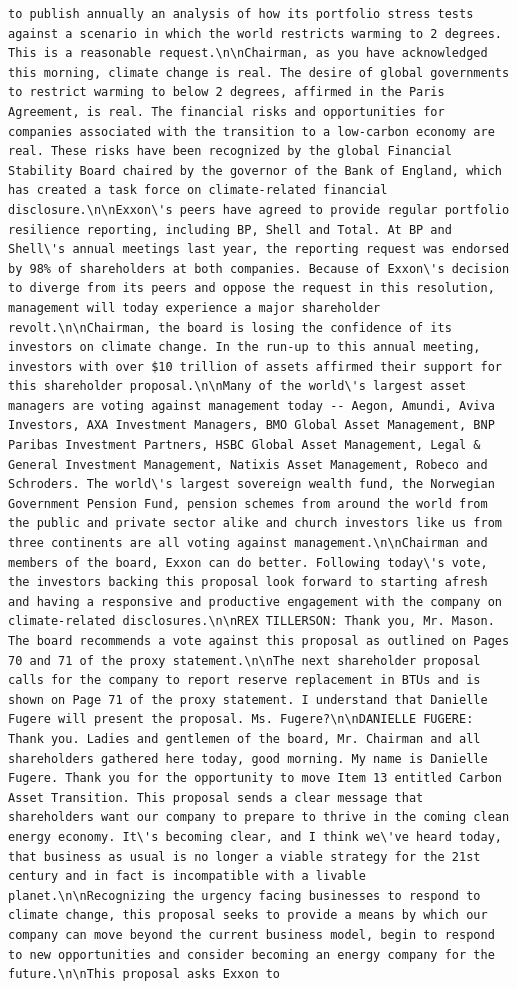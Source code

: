 \documentclass[
  letterpaper,
  DIV=11,
  numbers=noendperiod]{scrreprt}
\begin{document}
\begin{verbatim}
to publish annually an analysis of how its portfolio stress tests against a scenario in which the world restricts warming to 2 degrees. This is a reasonable request.\n\nChairman, as you have acknowledged this morning, climate change is real. The desire of global governments to restrict warming to below 2 degrees, affirmed in the Paris Agreement, is real. The financial risks and opportunities for companies associated with the transition to a low-carbon economy are real. These risks have been recognized by the global Financial Stability Board chaired by the governor of the Bank of England, which has created a task force on climate-related financial disclosure.\n\nExxon\'s peers have agreed to provide regular portfolio resilience reporting, including BP, Shell and Total. At BP and Shell\'s annual meetings last year, the reporting request was endorsed by 98% of shareholders at both companies. Because of Exxon\'s decision to diverge from its peers and oppose the request in this resolution, management will today experience a major shareholder revolt.\n\nChairman, the board is losing the confidence of its investors on climate change. In the run-up to this annual meeting, investors with over $10 trillion of assets affirmed their support for this shareholder proposal.\n\nMany of the world\'s largest asset managers are voting against management today -- Aegon, Amundi, Aviva Investors, AXA Investment Managers, BMO Global Asset Management, BNP Paribas Investment Partners, HSBC Global Asset Management, Legal & General Investment Management, Natixis Asset Management, Robeco and Schroders. The world\'s largest sovereign wealth fund, the Norwegian Government Pension Fund, pension schemes from around the world from the public and private sector alike and church investors like us from three continents are all voting against management.\n\nChairman and members of the board, Exxon can do better. Following today\'s vote, the investors backing this proposal look forward to starting afresh and having a responsive and productive engagement with the company on climate-related disclosures.\n\nREX TILLERSON: Thank you, Mr. Mason. The board recommends a vote against this proposal as outlined on Pages 70 and 71 of the proxy statement.\n\nThe next shareholder proposal calls for the company to report reserve replacement in BTUs and is shown on Page 71 of the proxy statement. I understand that Danielle Fugere will present the proposal. Ms. Fugere?\n\nDANIELLE FUGERE: Thank you. Ladies and gentlemen of the board, Mr. Chairman and all shareholders gathered here today, good morning. My name is Danielle Fugere. Thank you for the opportunity to move Item 13 entitled Carbon Asset Transition. This proposal sends a clear message that shareholders want our company to prepare to thrive in the coming clean energy economy. It\'s becoming clear, and I think we\'ve heard today, that business as usual is no longer a viable strategy for the 21st century and in fact is incompatible with a livable planet.\n\nRecognizing the urgency facing businesses to respond to climate change, this proposal seeks to provide a means by which our company can move beyond the current business model, begin to respond to new opportunities and consider becoming an energy company for the future.\n\nThis proposal asks Exxon to 
\end{verbatim}
\end{document}

